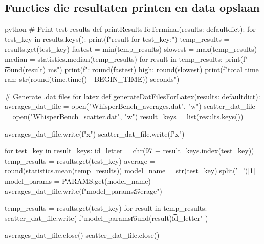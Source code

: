 \subsection*{Functies die resultaten printen en data opslaan}
\begin{mintedbox}{python}
  # Print test results
  def printResultsToTerminal(results: defaultdict):
    for test_key in results.keys():
      print(f"result for {test_key}:")
      temp_results = results.get(test_key)
      fastest = min(temp_results)
      slowest = max(temp_results)
      median = statistics.median(temp_results)
      for result in temp_results:
        print(f"\t-\t{round(result)} ms")
      print(f"\tlow: {round(fastest)} high: {round(slowest)}\n\tlow%
    print(f"total time ran: {str(round(time.time() - BEGIN_TIME))} seconds")

  # Generate .dat files for latex
  def generateDatFilesForLatex(results: defaultdict):
    averages_dat_file = open("WhisperBench_averages.dat", "w")
    scatter_dat_file = open("WhisperBench_scatter.dat", "w")
    result_keys = list(results.keys())

    averages_dat_file.write(f"x\ty\n")
    scatter_dat_file.write(f"x\ty\tlabel\n") 

    for test_key in result_keys:
      id_letter = chr(97 + result_keys.index(test_key))
      temp_results = results.get(test_key)
      average = round(statistics.mean(temp_results))
      model_name = str(test_key).split('_')[1]
      model_params = PARAMS.get(model_name)
      averages_dat_file.write(f"{model_params}\t{average}\n")

      temp_results = results.get(test_key)
      for result in temp_results:
        scatter_dat_file.write(
          f"{model_params}\t{round(result)}\t{id_letter}\n"
        )

    averages_dat_file.close()
    scatter_dat_file.close()
\end{mintedbox}